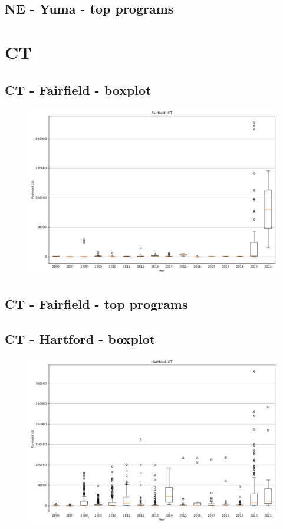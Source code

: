 \subsection*{NE - Yuma - top programs}

\newpage
\section*{CT}
\subsection*{CT - Fairfield - boxplot}
\begin{figure}[h]
\centering
\includegraphics[width=7in]{../output/boxplots/counties/Fairfield-CT_boxplot.png}
\end{figure}


\subsection*{CT - Fairfield - top programs}

\newpage
\subsection*{CT - Hartford - boxplot}
\begin{figure}[h]
\centering
\includegraphics[width=7in]{../output/boxplots/counties/Hartford-CT_boxplot.png}
\end{figure}


